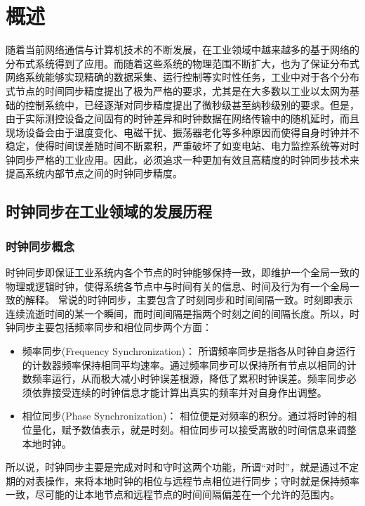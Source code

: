 
\chapter{概述}
\label{chap:intro}
随着当前网络通信与计算机技术的不断发展，在工业领域中越来越多的基于网络的分布式系统得到了应用。而随着这些系统的物理范围不断扩大，也为了保证分布式网络系统能够实现精确的数据采集、运行控制等实时性任务，工业中对于各个分布式节点的时间同步精度提出了极为严格的要求，尤其是在大多数以工业以太网为基础的控制系统中，已经逐渐对同步精度提出了微秒级甚至纳秒级别的要求。但是，由于实际测控设备之间固有的时钟差异和时钟数据在网络传输中的随机延时，而且现场设备会由于温度变化、电磁干扰、振荡器老化等多种原因而使得自身时钟并不稳定，使得时间误差随时间不断累积，严重破坏了如变电站、电力监控系统等对时钟同步严格的工业应用。因此，必须追求一种更加有效且高精度的时钟同步技术来提高系统内部节点之间的时钟同步精度。

\section{时钟同步在工业领域的发展历程}
\subsection{时钟同步概念}
\label{sec:concept}
时钟同步即保证工业系统内各个节点的时钟能够保持一致，即维护一个全局一致的物理或逻辑时钟，使得系统各节点中与时间有关的信息、时间及行为有一个全局一致的解释\supercite{1}。
常说的时钟同步，主要包含了时刻同步和时间间隔一致。时刻即表示连续流逝时间的某一个瞬间，而时间间隔是指两个时刻之间的间隔长度。所以，时钟同步主要包括频率同步和相位同步两个方面：
\begin{itemize}[noitemsep,topsep=0pt,parsep=0pt,partopsep=0pt]
	\item 频率同步(Frequency Synchronization)：
		所谓频率同步是指各从时钟自身运行的计数器频率保持相同平均速率。通过频率同步可以保持所有节点以相同的计数频率运行，从而极大减小时钟误差根源，降低了累积时钟误差。频率同步必须依靠接受连续的时钟信息才能计算出真实的频率并对自身作出调整。
	\item 相位同步(Phase Synchronization)：
		相位便是对频率的积分。通过将时钟的相位量化，赋予数值表示，就是时刻。相位同步可以接受离散的时间信息来调整本地时钟。
\end{itemize}

所以说，时钟同步主要是完成对时和守时这两个功能，所谓“对时”，就是通过不定期的对表操作，来将本地时钟的相位与远程节点相位进行同步；守时就是保持频率一致，尽可能的让本地节点和远程节点的时间间隔偏差在一个允许的范围内。

